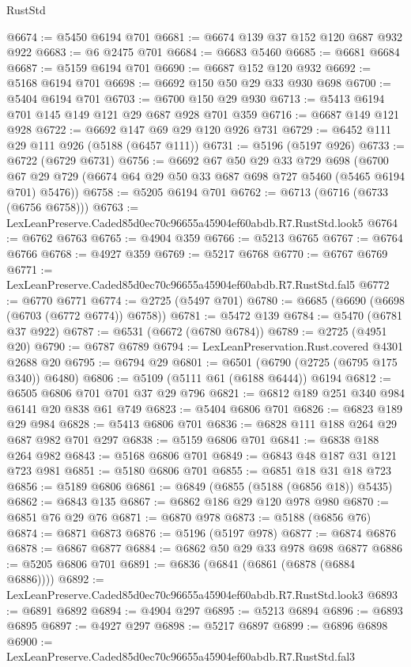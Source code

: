 \begin{lexlean}{RustStd}
\begin{coremodule}
@6674 := @5450 @6194 @701
@6681 := @6674 @139 @37 @152 @120 @687 @932 @922
@6683 := @6 @2475 @701
@6684 := @6683 @5460
@6685 := @6681 @6684
@6687 := @5159 @6194 @701
@6690 := @6687 @152 @120 @932
@6692 := @5168 @6194 @701
@6698 := @6692 @150 @50 @29 @33 @930 @698
@6700 := @5404 @6194 @701
@6703 := @6700 @150 @29 @930
@6713 := @5413 @6194 @701 @145 @149 @121 @29 @687 @928 @701 @359
@6716 := @6687 @149 @121 @928
@6722 := @6692 @147 @69 @29 @120 @926 @731
@6729 := @6452 @111 @29 @111 @926 (@5188 (@6457 @111))
@6731 := @5196 (@5197 @926)
@6733 := @6722 (@6729 @6731)
@6756 := @6692
    @67
    @50
    @29
    @33
    @729
    @698
    (@6700 @67 @29 @729 (@6674 @64 @29 @50 @33 @687 @698 @727 @5460 (@5465 @6194 @701) @5476))
@6758 := @5205 @6194 @701
@6762 := @6713 (@6716 (@6733 (@6756 @6758)))
@6763 := LexLeanPreserve.Caded85d0ec70c96655a45904ef60abdb.R7.RustStd.look5
@6764 := @6762 @6763
@6765 := @4904 @359
@6766 := @5213 @6765
@6767 := @6764 @6766
@6768 := @4927 @359
@6769 := @5217 @6768
@6770 := @6767 @6769
@6771 := LexLeanPreserve.Caded85d0ec70c96655a45904ef60abdb.R7.RustStd.fal5
@6772 := @6770 @6771
@6774 := @2725 (@5497 @701)
@6780 := @6685 (@6690 (@6698 (@6703 (@6772 @6774)) @6758))
@6781 := @5472 @139
@6784 := @5470 (@6781 @37 @922)
@6787 := @6531 (@6672 (@6780 @6784))
@6789 := @2725 (@4951 @20)
@6790 := @6787 @6789
@6794 := LexLeanPreservation.Rust.covered @4301 @2688 @20
@6795 := @6794 @29
@6801 := @6501 (@6790 (@2725 (@6795 @175 @340)) @6480)
@6806 := @5109 (@5111 @61 (@6188 @6444)) @6194
@6812 := @6505 @6806 @701 @701 @37 @29 @796
@6821 := @6812 @189 @251 @340 @984 @6141 @20 @838 @61 @749
@6823 := @5404 @6806 @701
@6826 := @6823 @189 @29 @984
@6828 := @5413 @6806 @701
@6836 := @6828 @111 @188 @264 @29 @687 @982 @701 @297
@6838 := @5159 @6806 @701
@6841 := @6838 @188 @264 @982
@6843 := @5168 @6806 @701
@6849 := @6843 @48 @187 @31 @121 @723 @981
@6851 := @5180 @6806 @701
@6855 := @6851 @18 @31 @18 @723
@6856 := @5189 @6806
@6861 := @6849 (@6855 (@5188 (@6856 @18)) @5435)
@6862 := @6843 @135
@6867 := @6862 @186 @29 @120 @978 @980
@6870 := @6851 @76 @29 @76
@6871 := @6870 @978
@6873 := @5188 (@6856 @76)
@6874 := @6871 @6873
@6876 := @5196 (@5197 @978)
@6877 := @6874 @6876
@6878 := @6867 @6877
@6884 := @6862 @50 @29 @33 @978 @698 @6877
@6886 := @5205 @6806 @701
@6891 := @6836 (@6841 (@6861 (@6878 (@6884 @6886))))
@6892 := LexLeanPreserve.Caded85d0ec70c96655a45904ef60abdb.R7.RustStd.look3
@6893 := @6891 @6892
@6894 := @4904 @297
@6895 := @5213 @6894
@6896 := @6893 @6895
@6897 := @4927 @297
@6898 := @5217 @6897
@6899 := @6896 @6898
@6900 := LexLeanPreserve.Caded85d0ec70c96655a45904ef60abdb.R7.RustStd.fal3

\end{coremodule}
\end{lexlean}
